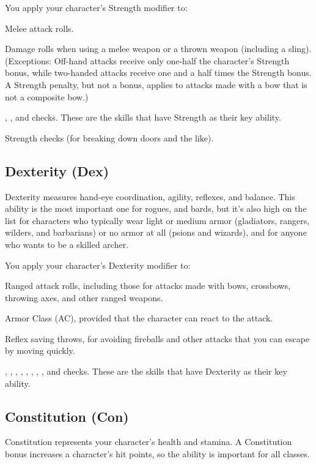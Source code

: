 You apply your character's Strength modifier to:
\begin{itemize*}
\item Melee attack rolls.
\item Damage rolls when using a melee weapon or a thrown weapon (including a sling). (Exceptions: Off-hand attacks receive only one-half the character's Strength bonus, while two-handed attacks receive one and a half times the Strength bonus. A Strength penalty, but not a bonus, applies to attacks made with a bow that is not a composite bow.)
\item {}, , and  checks. These are the skills that have Strength as their key ability.
\item Strength checks (for breaking down doors and the like).
\end{itemize*}

\subsection{Dexterity (Dex)}
Dexterity measures hand-eye coordination, agility, reflexes, and balance. This ability is the most important one for rogues, and bards, but it's also high on the list for characters who typically wear light or medium armor (gladiators, rangers, wilders, and barbarians) or no armor at all (psions and wizards), and for anyone who wants to be a skilled archer.

You apply your character's Dexterity modifier to:
\begin{itemize*}
\item Ranged attack rolls, including those for attacks made with bows, crossbows, throwing axes, and other ranged weapons.
\item Armor Class (AC), provided that the character can react to the attack.
\item Reflex saving throws, for avoiding fireballs and other attacks that you can escape by moving quickly.
\item {}, , , , , , , , and  checks. These are the skills that have Dexterity as their key ability.
\end{itemize*}
\subsection{Constitution (Con)}
Constitution represents your character's health and stamina. A Constitution bonus increases a character's hit points, so the ability is important for all classes.

